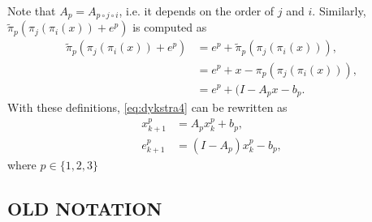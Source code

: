 \documentclass[hidelinks]{article}
\begin{document}
Note that $A_p=A_{p\circ j\circ i}$, i.e. it depends on the order of $j$ and $i$. Similarly, $\tilde{\pi}_p(\pi_j(\pi_i(x))+e^p)$ is computed as
\begin{equation}
\begin{aligned}
\tilde{\pi}_p(\pi_j(\pi_i(x))+e^p)
&=e^p+\tilde{\pi}_p(\pi_j(\pi_i(x))),\\
&=e^p+x-\pi_p(\pi_j(\pi_i(x))),\\
&=e^p+(I-A_px-b_p.
\end{aligned}
\end{equation}
With these definitions, \eqref{eq:dykstra4} can be rewritten as
\begin{subequations}
\begin{align}
x_{k+1}^p&=A_p x_k^p +b_p,\\
e_{k+1}^p&=(I-A_p) x_k^p -b_p,
\end{align}
\end{subequations}
where $p\in\lbrace 1,2,3\rbrace$



\newpage
\subsection{OLD NOTATION}
\end{document}
